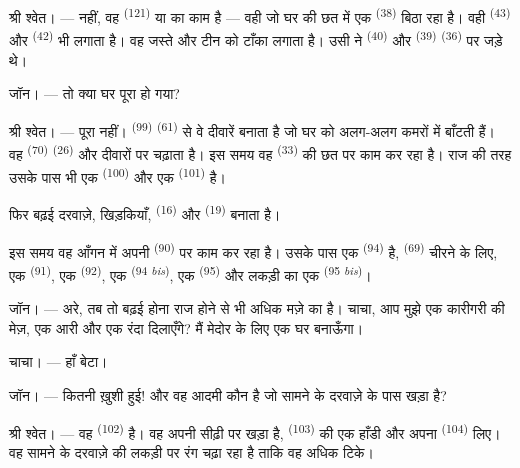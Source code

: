 \textsc{श्री श्वेत}। --- नहीं, वह  \textsuperscript{(121)} या
 का काम है — वही जो घर की छत में एक 
\textsuperscript{(38)} बिठा रहा है। वही  \textsuperscript{(43)}
और  \textsuperscript{(42)} भी लगाता है। वह जस्ते और टीन को
टाँका लगाता है। उसी ने  \textsuperscript{(40)} और 
\textsuperscript{(39)}  \textsuperscript{(36)} पर जड़े थे।

\textsc{जॉन}। --- तो क्या घर पूरा हो गया?

\VUsaut{3.0mm}
\VUsaut{3.0mm}

\textsc{श्री श्वेत}। --- पूरा नहीं। 
\textsuperscript{(99)}  \textsuperscript{(61)} से वे दीवारें बनाता है
जो घर को अलग-अलग कमरों में बाँटती हैं। वह  \textsuperscript{(70)} 
\textsuperscript{(26)} और दीवारों पर चढ़ाता है। इस समय वह
 \textsuperscript{(33)} की छत पर काम कर रहा है। राज की तरह उसके पास
भी एक  \textsuperscript{(100)} और एक 
\textsuperscript{(101)} है।

फिर बढ़ई दरवाज़े, खिड़कियाँ,  \textsuperscript{(16)} और
 \textsuperscript{(19)} बनाता है।

इस समय वह आँगन में अपनी  \textsuperscript{(90)} पर काम कर
रहा है। उसके पास एक  \textsuperscript{(94)} है, 
\textsuperscript{(69)} चीरने के लिए, एक  \textsuperscript{(91)}, एक
 \textsuperscript{(92)}, एक 
\textsuperscript{(94 \textit{bis})}, एक  \textsuperscript{(95)} और
लकड़ी का एक  \textsuperscript{(95 \textit{bis})}।

\textsc{जॉन}। --- अरे, तब तो बढ़ई होना राज होने से भी अधिक मज़े का है। चाचा, आप
मुझे एक कारीगरी की मेज़, एक आरी और एक रंदा दिलाएँगे? मैं मेदोर के लिए एक घर
बनाऊँगा।

\textsc{चाचा}। --- हाँ बेटा।

\textsc{जॉन}। --- कितनी ख़ुशी हुई! और वह आदमी कौन है जो सामने के दरवाज़े के पास
खड़ा है?

\VUsaut{3.0mm}
\VUsaut{3.0mm}

\textsc{श्री श्वेत}। --- वह  \textsuperscript{(102)} है। वह अपनी
सीढ़ी पर खड़ा है,  \textsuperscript{(103)} की एक हाँडी और अपना
 \textsuperscript{(104)} लिए। वह सामने के दरवाज़े की लकड़ी पर रंग
चढ़ा रहा है ताकि वह अधिक टिके।

